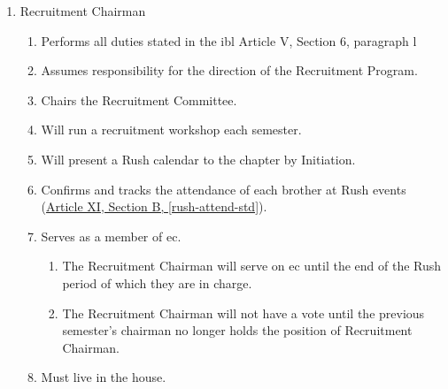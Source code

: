 \begin{enumerate}
        \item Recruitment Chairman
			\begin{enumerate}
				\item Performs all duties stated in the \gls{ibl} Article V, Section 6, paragraph l
				\item Assumes responsibility for the direction of the Recruitment Program.
				\item Chairs the Recruitment Committee.
				\item Will run a recruitment workshop each semester.
				\item Will present a Rush calendar to the chapter by Initiation.
				\item Confirms and tracks the attendance of each brother at Rush events (\hyperref[rush-attend-std]{Article XI, Section B, \autoref*{rush-attend-std}}).
				\item Serves as a member of \gls{ec}. \label{recruit-chair-term}
					\begin{enumerate}
						\item The Recruitment Chairman will serve on \gls{ec} until the end of the Rush period of which they are in charge.
						\item The Recruitment Chairman will not have a vote until the previous semester's chairman no longer holds the position of Recruitment Chairman.
					\end{enumerate}
                \item Must live in the house.
			\end{enumerate}


\end{enumerate}
